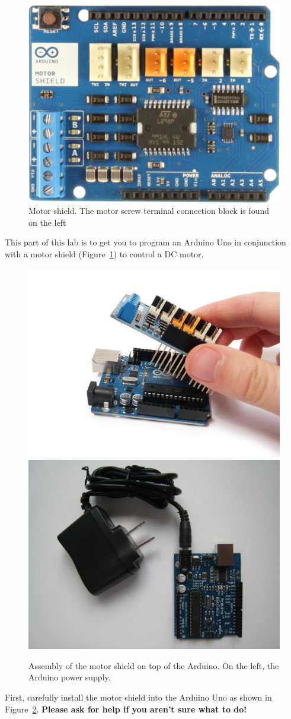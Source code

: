 \documentclass{instructions}
\begin{document}
\begin{figure}[h!]
    \centering
    \includegraphics[width=0.6\linewidth]{motorshield}
    \caption{Motor shield. The motor screw terminal connection block is found on
the left}
    \label{motorshield}
\end{figure}

This part of this lab is to get you to program an Arduino Uno in conjunction
with a motor shield (Figure~\ref{motorshield}) to control a DC motor.


\begin{figure}
    \centering
    \includegraphics[width=0.45\linewidth]{motorshield-assembly}
    \includegraphics[width=0.45\linewidth]{arduino-powersupply}
    \caption{Assembly of the motor shield on top of the Arduino. On the left,
    the Arduino power supply.}
    \label{assembly}
\end{figure}

First, carefully install the motor shield into the Arduino Uno as shown in
Figure~\ref{assembly}. \textbf{Please ask for help if you aren’t sure what to
do!}
\end{document}
